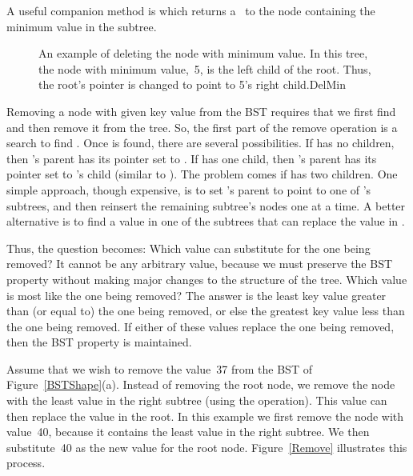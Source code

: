 A useful companion method is  which returns a
\pointref\ to the node containing the minimum value in the subtree.



\begin{figure}
\vspace{-\bigskipamount}

{An example of deleting the node with minimum value.
In this tree, the node with minimum value,~5, is the left child of the
root.
Thus, the root's  pointer is changed to point to 5's right
child.}{DelMin}
\bigskip
\end{figure}

Removing a node with given key value  from the BST requires
that we first find  and then remove it from the tree.
So, the first part of the remove operation is a search to find
.
Once  is found, there are several possibilities.
If  has no children, then 's parent has its pointer
set to \NULL.
If  has one child, then 's parent has
its pointer set to 's child (similar to ).
The problem comes if  has two children.
One simple approach, though expensive, is to set 's parent to
point to one of 's subtrees, and then reinsert the remaining
subtree's nodes one at a time.
A better alternative is to find a value in one of the
subtrees that can replace the value in .

Thus, the question becomes:
Which value can substitute for the one being removed?
It cannot be any arbitrary value, because we must preserve the BST
property without making major changes to the structure of the tree.
Which value is most like the one being removed?
The answer is the least key value greater than (or equal to) the one
being removed, or else the greatest key value less than the one being
removed.
If either of these values replace the one being removed,
then the BST property is maintained.

\begin{example}
Assume that we wish to remove the value~37 from the BST
of Figure~\ref{BSTShape}(a).
Instead of removing the root node, we remove the node with the least
value in the right subtree (using the 
operation).
This value can then replace the value in the root.
In this example we first remove the node with value~40,
because it contains the least value in the right subtree.
We then substitute~40 as the new value for the root node.
Figure~\ref{Remove} illustrates this process.
\end{example}

